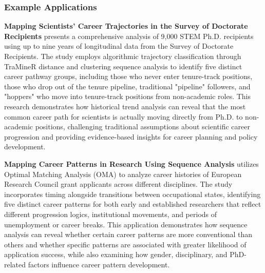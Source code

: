 \documentclass[../main.tex]{subfiles}
\begin{document}
\subsubsection{Example Applications}


\textbf{Mapping Scientists' Career Trajectories in the Survey of Doctorate Recipients} \citep{nature2023} presents a comprehensive analysis of 9,000 STEM Ph.D. recipients using up to nine years of longitudinal data from the Survey of Doctorate Recipients. The study employs algorithmic trajectory classification through TraMineR distance and clustering sequence analysis to identify five distinct career pathway groups, including those who never enter tenure-track positions, those who drop out of the tenure pipeline, traditional "pipeline" followers, and "hoppers" who move into tenure-track positions from non-academic roles. This research demonstrates how historical trend analysis can reveal that the most common career path for scientists is actually moving directly from Ph.D. to non-academic positions, challenging traditional assumptions about scientific career progression and providing evidence-based insights for career planning and policy development.


\textbf{Mapping Career Patterns in Research Using Sequence Analysis} \citep{pmc2020} utilizes Optimal Matching Analysis (OMA) to analyze career histories of European Research Council grant applicants across different disciplines. The study incorporates timing alongside transitions between occupational states, identifying five distinct career patterns for both early and established researchers that reflect different progression logics, institutional movements, and periods of unemployment or career breaks. This application demonstrates how sequence analysis can reveal whether certain career patterns are more conventional than others and whether specific patterns are associated with greater likelihood of application success, while also examining how gender, disciplinary, and PhD-related factors influence career pattern development.

\end{document}
